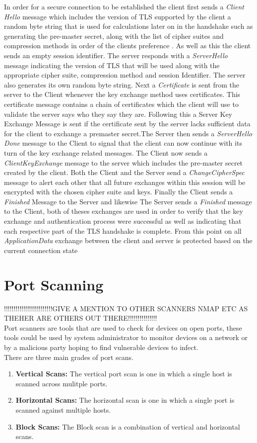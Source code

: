 \documentclass[a4wide,leqno,12pt]{report}
\begin{document}
In order for a secure connection to be established the client first sends a \textit{Client Hello} message which includes the version of TLS supported by the client a random byte string that is used for calculations later on in the handshake such as generating the pre-master secret,  along with the list of cipher suites and compression methods in order of the clients preference \cite{tlsDemoServer}. As well as this the client sends an empty session identifier\cite{turner2014transport}.
The server responds with a \textit{ServerHello} message indicating the version of TLS that will be used along with the appropriate cipher suite, compression method and session Identifier. The server also generates its own random byte string. Next a \textit{Certificate} is sent from the server to the Client whenever the key exchange method uses certificates. This certificate message contains a chain of certificates which the client will use to validate the server says who they say they are. Following this a Server Key Exchange Message is sent if the certificate sent by the server lacks sufficient data for the client to exchange a premaster secret.The Server then sends a \textit{ServerHello Done} message to the Client to signal that the client can now continue with its turn of the key exchange related messages. The Client now sends a \textit{ClientKeyExchange} message to the server which includes the pre-master secret created by the client. Both the Client and the Server send a \textit{ChangeCipherSpec} message to alert each other that all future exchanges within this session will be encrypted with the chosen cipher suite and keys. Finally the Client sends a \textit{Finished} Message to the Server and likewise The Server sends a \textit{Finished } message to the Client, both of theses exchanges are used in order to verify that the key exchange and authentication process were successful as well as indicating that each respective part of the TLS handshake is complete. From this point on all \textit{ApplicationData} exchange between the client and server is protected based on the current connection state \cite{tlsDemoServer}\cite{turner2014transport}
\section{Port Scanning} 
!!!!!!!!!!!!!!!!!!!!!!!!!GIVE A MENTION TO OTHER SCANNERS NMAP ETC AS THEHER ARE OTHERS OUT THERE!!!!!!!!!!!!!!!\\
Port scanners are tools that are used to check for devices on open ports, these tools could be used by system administrator to monitor devices on a network or by a malicious party hoping to find vulnerable devices to infect. \\
There are three main grades of port scans.
\begin{enumerate}
\item\textbf{Vertical Scans:}
The vertical port scan is one in which a single host is scanned across mulitple ports.
\item\textbf{Horizontal Scans:}
The horizontal scan is one in which a single port is scanned against multiple hosts.
\item\textbf{Block Scans:}
The Block scan is a combination of vertical and horizontal scans.\cite{lee2003detection}
\end{enumerate}
\end{document}
